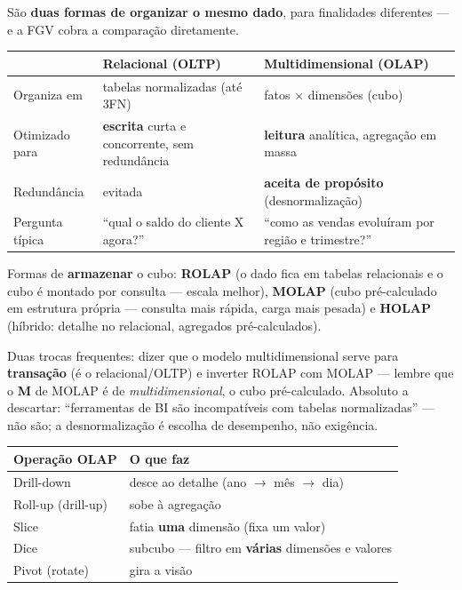 \begin{conceito}
São \textbf{duas formas de organizar o mesmo dado}, para finalidades
diferentes --- e a FGV cobra a comparação diretamente.

\begin{center}
\begin{tabular}{@{}p{2.6cm}p{4.2cm}p{4.6cm}@{}}
\toprule
& \textbf{Relacional (OLTP)} & \textbf{Multidimensional (OLAP)} \\
\midrule
Organiza em & tabelas normalizadas (até 3FN) & fatos $\times$ dimensões (cubo) \\
Otimizado para & \textbf{escrita} curta e concorrente, sem redundância & \textbf{leitura} analítica, agregação em massa \\
Redundância & evitada & \textbf{aceita de propósito} (desnormalização) \\
Pergunta típica & ``qual o saldo do cliente X agora?'' & ``como as vendas evoluíram por região e trimestre?'' \\
\bottomrule
\end{tabular}
\end{center}

Formas de \textbf{armazenar} o cubo: \textbf{ROLAP} (o dado fica em tabelas
relacionais e o cubo é montado por consulta --- escala melhor),
\textbf{MOLAP} (cubo pré-calculado em estrutura própria --- consulta mais
rápida, carga mais pesada) e \textbf{HOLAP} (híbrido: detalhe no relacional,
agregados pré-calculados).
\end{conceito}

\begin{pegadinha}
Duas trocas frequentes: dizer que o modelo multidimensional serve para
\textbf{transação} (é o relacional/OLTP) e inverter ROLAP com MOLAP ---
lembre que o \textbf{M} de MOLAP é de \emph{multidimensional}, o cubo
pré-calculado. Absoluto a descartar: ``ferramentas de BI são incompatíveis
com tabelas normalizadas'' --- não são; a desnormalização é escolha de
desempenho, não exigência.
\end{pegadinha}

\begin{center}
\begin{tabular}{@{}p{3cm}p{8.6cm}@{}}
\toprule
\textbf{Operação OLAP} & \textbf{O que faz} \\
\midrule
Drill-down & desce ao detalhe (ano $\to$ mês $\to$ dia) \\
Roll-up (drill-up) & sobe à agregação \\
Slice & fatia \textbf{uma} dimensão (fixa um valor) \\
Dice & subcubo --- filtro em \textbf{várias} dimensões e valores \\
Pivot (rotate) & gira a visão \\
\bottomrule
\end{tabular}
\end{center}

